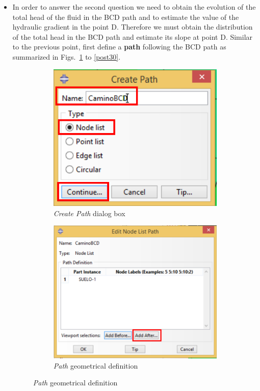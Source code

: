 \begin{itemize}
  
\item In order to answer the second question we need to obtain the
  evolution of the total head of the fluid in the BCD path and to
  estimate the value of the hydraulic gradient in the point
  D. Therefore we must obtain the distribution of the total head in
  the BCD path and estimate its slope at point D. Similar to the
  previous point, first define a \textbf{path} following the BCD path
  as summarized in Figs.~\ref{post27} to \ref{post30}.
  \begin{figure}[!h]
    \centering
    \begin{subfigure}[!h]{0.50\textwidth}
      \includegraphics[width=\textwidth]{./body/images/post27.pdf}
      \caption{\textit{Create Path} dialog box}
      \label{post27}
    \end{subfigure}%
    \begin{subfigure}[!h]{0.50\textwidth}
      \includegraphics[width=\textwidth]{./body/images/post28.pdf}
      \caption{\textit{Path} geometrical definition}
      \label{post28}
    \end{subfigure}%


\end{figure}
\end{itemize}

